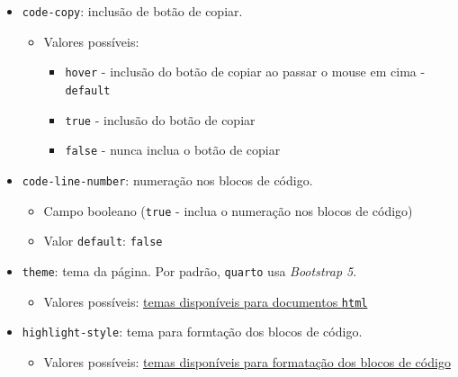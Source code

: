 \documentclass[
  10pt,
  ignorenonframetext,
]{beamer}
\providecommand{\tightlist}{%
  \setlength{\itemsep}{0pt}\setlength{\parskip}{0pt}}\usepackage{longtable,booktabs,array}
\begin{document}
\begin{frame}[fragile]
\begin{itemize}
\tightlist
\item
  \texttt{code-copy}: inclusão de botão de copiar.

  \begin{itemize}
  \tightlist
  \item
    Valores possíveis:

    \begin{itemize}
    \tightlist
    \item
      \texttt{hover} - inclusão do botão de copiar ao passar o mouse em
      cima - \texttt{default}
    \item
      \texttt{true} - inclusão do botão de copiar
    \item
      \texttt{false} - nunca inclua o botão de copiar
    \end{itemize}
  \end{itemize}
\item
  \texttt{code-line-number}: numeração nos blocos de código.

  \begin{itemize}
  \tightlist
  \item
    Campo booleano (\texttt{true} - inclua o numeração nos blocos de
    código)
  \item
    Valor \texttt{default}: \texttt{false}
  \end{itemize}
\item
  \texttt{theme}: tema da página. Por padrão, \texttt{quarto} usa
  \emph{Bootstrap 5}.

  \begin{itemize}
  \tightlist
  \item
    Valores possíveis:
    \href{https://quarto.org/docs/output-formats/html-themes.html}{temas
    disponíveis para documentos \texttt{html}}
  \end{itemize}
\item
  \texttt{highlight-style}: tema para formtação dos blocos de código.

  \begin{itemize}
  \tightlist
  \item
    Valores possíveis:
    \href{https://quarto.org/docs/output-formats/html-code.html\#highlighting}{temas
    disponíveis para formatação dos blocos de código}
  \end{itemize}
\end{itemize}
\end{frame}
\end{document}
